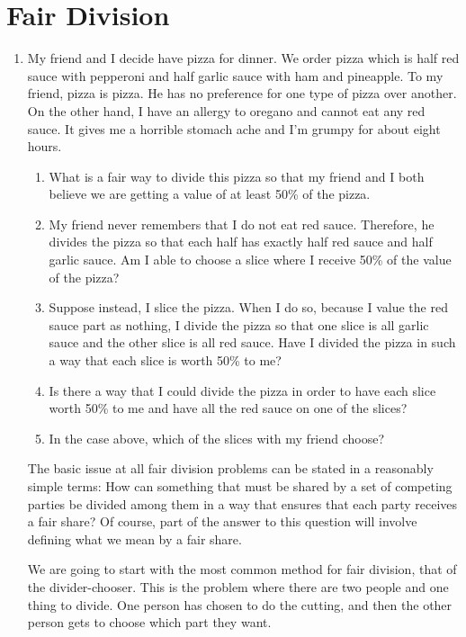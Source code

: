 \section{Fair Division} \label{sec:FairDivision}
\begin{enumerate}

\item My friend and I decide have pizza for dinner. We order pizza which is half red sauce with pepperoni and half garlic sauce with ham and pineapple. To my friend, pizza is pizza. He has no preference for one type of pizza over another. On the other hand, I have an allergy to oregano and cannot eat any red sauce. It gives me a horrible stomach ache and I'm grumpy for about eight hours. 
\begin{enumerate}
	\item What is a fair way to divide this pizza so that my friend and I both believe we are getting a value of at least 50\% of the pizza. \vfill
	\item My friend never remembers that I do not eat red sauce. Therefore, he divides the pizza so that each half has exactly half red sauce and half garlic sauce. Am I able to choose a slice where I receive 50\% of the value of the pizza?  \vfill
	\item Suppose instead, I slice the pizza. When I do so, because I value the red sauce part as nothing, I divide the pizza so that one slice is all garlic sauce and the other slice is all red sauce. Have I divided the pizza in such a way that each slice is worth 50\%  to me?  \vfill
	\item Is there a way that I could divide the pizza in order to have each slice worth 50\% to me and have all the red sauce on one of the slices?  \vfill
	\item In the case above, which of the slices with my friend choose? \vfill
\end{enumerate}

\clearpage
The basic issue at all fair division problems can be stated in a reasonably simple terms: How can something that must be shared by a set of competing parties be divided among them in a way that ensures that each party receives a fair share? Of course, part of the answer to this question will involve defining what we mean by a fair share.

We are going to start with the most common method for fair division, that of the divider-chooser.   This is the problem where there are two people and one thing to divide. One person has chosen to do the cutting, and then the other person gets to choose which part they want.


\end{enumerate}
